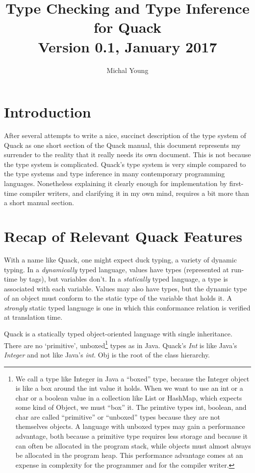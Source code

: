 \documentclass[11pt]{article}
\begin{document}
\title{Type Checking and Type Inference for Quack\\
\small   Version 0.1, January 2017}

\author{Michal Young}
\date{ }
\maketitle


\section{Introduction}

After several attempts to write a nice, succinct description of the
type system of Quack as one short section of the Quack manual, 
this document represents my surrender to the reality that it 
really needs its own document.  This is not because the type system is
complicated.  Quack's type system  is very simple compared to the type systems
and type inference in many contemporary programming languages.
Nonetheless explaining it clearly enough for implementation by 
first-time compiler writers, and clarifying it in my own mind, 
requires a bit more than a short manual section. 

\section{Recap of Relevant Quack Features}

With a name like Quack, one might expect duck typing, a variety of
dynamic typing.  In a \emph{dynamically} typed language, values have
types (represented at run-time by tags), but variables don't.  In a
\emph{statically} typed language, a type is associated with each
variable.  Values may also have types, but the dynamic type of an
object must conform to the static type of the variable that holds it.
A \emph{strongly} static typed language is one in which this
conformance relation is verified at translation time.

Quack is a statically typed object-oriented language with single
inheritance. There are no `primitive', unboxed\footnote{We call a type
  like Integer in Java a ``boxed'' type, because the Integer object is
  like a box around the int value it holds.  When we want to use an
  int or a char or a boolean value in a collection like List or
  HashMap, which expects some kind of Object, we must ``box'' it. The
  primtive types int, boolean, and char are called ``primitive'' or
  ``unboxed'' types because they are not themselves objects.  
  A language with unboxed types may gain a performance advantage, 
  both because a primitive type requires less storage and because it
  can often be allocated in the program stack, while objects must
  almost always be allocated in the program heap.  This performance
  advantage comes at an expense in complexity for the programmer and
  for the compiler writer.}
 types as in Java.
Quack's \emph{Int} is like Java's \emph{Integer} and not like Java's
\emph{int}. Obj is the root of the class hierarchy.
\end{document}
